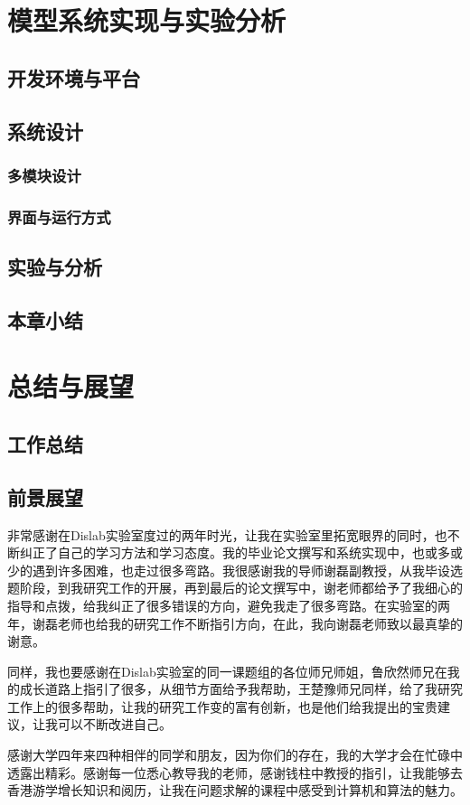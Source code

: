 \documentclass[winfonts]{njuthesis}
\begin{document}
\chapter{模型系统实现与实验分析}
	\section{开发环境与平台}
	\section{系统设计}
		\subsection{多模块设计}
		\subsection{界面与运行方式}
	\section{实验与分析}
	\section{本章小结}
\chapter{总结与展望}
	\section{工作总结}
	\section{前景展望}

	\begin{acknowledgement}
		
		非常感谢在Dislab实验室度过的两年时光，让我在实验室里拓宽眼界的同时，也不断纠正了自己的学习方法和学习态度。我的毕业论文撰写和系统实现中，也或多或少的遇到许多困难，也走过很多弯路。我很感谢我的导师谢磊副教授，从我毕设选题阶段，到我研究工作的开展，再到最后的论文撰写中，谢老师都给予了我细心的指导和点拨，给我纠正了很多错误的方向，避免我走了很多弯路。在实验室的两年，谢磊老师也给我的研究工作不断指引方向，在此，我向谢磊老师致以最真挚的谢意。
		
		同样，我也要感谢在Dislab实验室的同一课题组的各位师兄师姐，鲁欣然师兄在我的成长道路上指引了很多，从细节方面给予我帮助，王楚豫师兄同样，给了我研究工作上的很多帮助，让我的研究工作变的富有创新，也是他们给我提出的宝贵建议，让我可以不断改进自己。
		
		感谢大学四年来四种相伴的同学和朋友，因为你们的存在，我的大学才会在忙碌中透露出精彩。感谢每一位悉心教导我的老师，感谢钱柱中教授的指引，让我能够去香港游学增长知识和阅历，让我在问题求解的课程中感受到计算机和算法的魅力。
		
	\end{acknowledgement}
\end{document}
